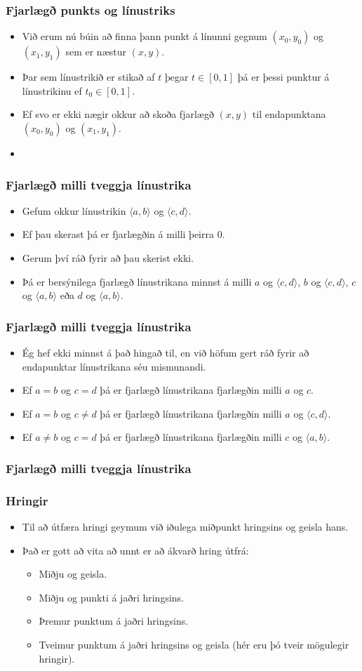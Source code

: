 \documentclass{beamer}
\newcommand\env[2]
{
	\begin{#1}
	#2
	\end{#1}
}
\newcommand\code[1]{\tiny}
\begin{document}
\env{frame}
{
	\frametitle{Fjarlægð punkts og línustriks}
	\env{itemize}
	{
		\item<1-> Við erum nú búin að finna þann punkt á línunni gegnum $(x_0, y_0)$ og $(x_1, y_1)$ sem er
			næstur $(x, y)$. 
		\item<2-> Þar sem línustrikið er stikað af $t$ þegar $t \in [0, 1]$ þá er þessi punktur
			á línustrikinu ef $t_0 \in [0, 1]$.
		\item<3-> Ef svo er ekki nægir okkur að skoða fjarlægð $(x, y)$ til endapunktana $(x_0, y_0)$ og $(x_1, y_1)$.
		\item<4-> \code{p2l.h}
	}
}

\env{frame}
{
	\frametitle{Fjarlægð milli tveggja línustrika}
	\env{itemize}
	{
		\item<1-> Gefum okkur línustrikin $\langle a, b \rangle$ og $\langle c, d \rangle$.
		\item<2-> Ef þau skerast þá er fjarlægðin á milli þeirra $0$.
		\item<3-> Gerum því ráð fyrir að þau skerist ekki.
		\item<4-> Þá er bersýnilega fjarlægð línustrikana minnst á milli 
			$a$ og $\langle c, d \rangle$, 
			$b$ og $\langle c, d \rangle$, 
			$c$ og $\langle a, b \rangle$ eða 
			$d$ og $\langle a, b \rangle$.
	}
}

\env{frame}
{
	\frametitle{Fjarlægð milli tveggja línustrika}
	\env{itemize}
	{
		\item<1-> Ég hef ekki minnst á það hingað til, en við höfum gert ráð fyrir að endapunktar 
			línustrikana séu mismunandi.
		\item<2-> Ef $a = b$ og $c = d$ þá er fjarlægð línustrikana fjarlægðin milli $a$ og $c$.
		\item<3-> Ef $a = b$ og $c \neq d$ þá er fjarlægð línustrikana fjarlægðin milli $a$ og $\langle c, d \rangle$.
		\item<4-> Ef $a \neq b$ og $c = d$ þá er fjarlægð línustrikana fjarlægðin milli $c$ og $\langle a, b \rangle$.
	}
}

\env{frame}
{
	\frametitle{Fjarlægð milli tveggja línustrika}
	\code{l2l.h}
}

\env{frame}
{
	\frametitle{Hringir}
	\env{itemize}
	{
		\item<1-> Til að útfæra hringi geymum við iðulega miðpunkt hringsins og geisla hans.
		\item<2-> Það er gott að vita að unnt er að ákvarð hring útfrá:
		\env{itemize}
		{
			\item<3-> Miðju og geisla.
			\item<4-> Miðju og punkti á jaðri hringsins.
			\item<5-> Þremur punktum á jaðri hringsins.
			\item<6-> Tveimur punktum á jaðri hringsins og geisla (hér eru þó tveir mögulegir hringir).
		}
	}
}
\end{document}
